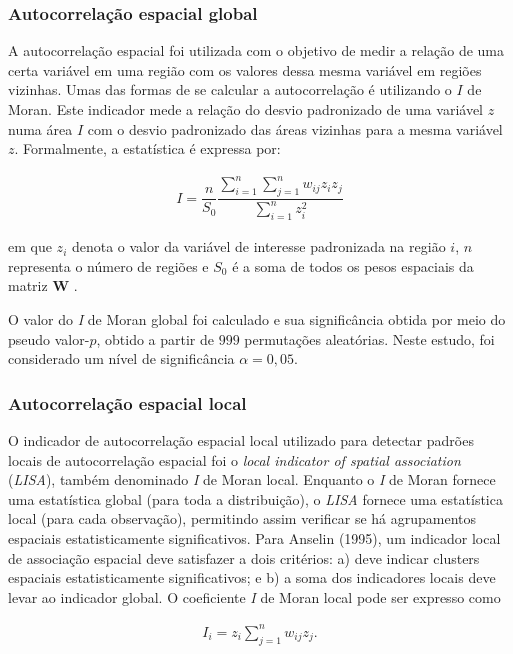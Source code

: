 \subsubsection{Autocorrelação espacial global}

A autocorrelação espacial foi utilizada com o objetivo de medir a relação de uma certa variável em uma região com os valores dessa mesma variável em regiões vizinhas. Umas das formas de se calcular a autocorrelação é utilizando o $I$ de Moran. Este indicador mede a relação do desvio padronizado de uma variável $z$ numa área $I$ com o desvio padronizado das áreas vizinhas para a mesma variável $z$. Formalmente, a estatística é expressa por:

\begin{align}\label{IMoran_2}
    I = \dfrac{n}{S_0} \dfrac{\sum_{i=1}^{n} \sum_{j=1}^{n} w_{ij} z_i z_j}{\sum_{i=1}^{n} z_i^2}
\end{align}
	
\noindent em que $z_i$ denota o valor da variável de interesse padronizada na região $i$, $n$ representa o número de regiões e $S_0$ é a soma de todos os pesos espaciais da matriz $\boldsymbol{W}$ \cite{almeida12_2}.

O valor do \textit{I} de Moran global foi calculado e sua significância obtida por meio do pseudo valor-$p$, obtido a partir de $999$ permutações aleatórias. Neste estudo, foi considerado um nível de significância $\alpha = 0,05$.

\subsubsection{Autocorrelação espacial local}

O indicador de autocorrelação espacial local utilizado para detectar padrões locais de autocorrelação espacial foi o \textit{local indicator of spatial association} (\textit{LISA}), também denominado \textit{I} de Moran local. Enquanto o \textit{I} de Moran fornece uma estatística global (para toda a distribuição), o \textit{LISA} fornece uma estatística local (para cada observação), permitindo assim verificar se há agrupamentos espaciais estatisticamente significativos. Para Anselin (1995), um indicador local de associação espacial deve satisfazer a dois critérios: a) deve indicar clusters espaciais estatisticamente significativos; e b) a soma dos indicadores locais deve levar ao indicador global. O coeficiente \textit{I} de Moran local pode ser expresso como

\begin{align*}
	I_i = z_i \sum_{j=1}^{n} w_{ij} z_j.
\end{align*}


